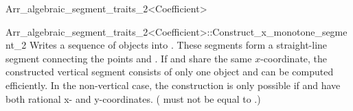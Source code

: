 \begin{ccRefClass}{Arr_algebraic_segment_traits_2<Coefficient>}
\begin{ccClass}{Arr_algebraic_segment_traits_2<Coefficient>::Construct_x_monotone_segment_2}
        {Writes a sequence of  objects into .
         These segments form a straight-line segment connecting
	 the points  and . If  and  share the
	 same $x$-coordinate, the constructed vertical segment consists of
	 only one  object and can be computed
	 efficiently. In the non-vertical case, 
	 the construction is only possible if  and  
         have both rational x- and y-coordinates.
         \ccPrecond( must not be equal to .)
	}


\end{ccClass}




\ccGlue
{}
\ccGlue
{}


\end{ccRefClass}

\ccRefPageEnd

